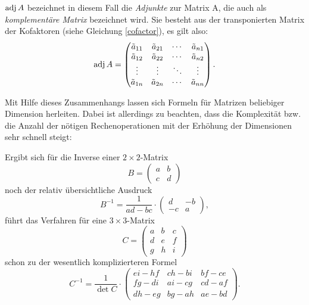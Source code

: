 $\operatorname{adj}A$ bezeichnet in diesem Fall die \emph{Adjunkte} zur Matrix A, die auch als \emph{komplementäre Matrix} bezeichnet wird. Sie besteht aus der transponierten Matrix der Kofaktoren (siehe Gleichung \ref{cofactor}), es gilt also:
\begin{equation}
 \operatorname{adj}A = \begin{pmatrix}
   \tilde a_{11} & \tilde a_{21} & \cdots & \tilde a_{n1}\\
   \tilde a_{12} & \tilde a_{22} & \cdots & \tilde a_{n2}\\
   \vdots & \vdots & \ddots & \vdots\\
   \tilde a_{1n} & \tilde a_{2n} & \cdots & \tilde a_{nn}
 \end{pmatrix}.
\end{equation}

Mit Hilfe dieses Zusammenhangs lassen sich Formeln für Matrizen beliebiger Dimension herleiten. Dabei ist allerdings zu beachten, dass die Komplexität bzw. die Anzahl der nötigen Rechenoperationen mit der Erhöhung der Dimensionen sehr schnell steigt:

Ergibt sich für die Inverse einer $2 \times 2$-Matrix
\begin{equation}
 B = \begin{pmatrix}
  a & b \\
  c & d
 \end{pmatrix}
\end{equation}
noch der relativ übersichtliche Ausdruck
\begin{equation}
 B^{-1} = \frac{1}{ad-bc} \cdot
 \begin{pmatrix}
  d & -b \\
  -c & a
 \end{pmatrix},
\end{equation}
führt das Verfahren für eine $3 \times 3$-Matrix
\begin{equation}
 C = \begin{pmatrix}
  a & b & c \\
  d & e & f \\
  g & h & i
 \end{pmatrix}
\end{equation}
schon zu der wesentlich komplizierteren Formel
\begin{equation}
 C^{-1} = \frac{1}{\det C} \cdot
 \begin{pmatrix}
  ei - hf & ch - bi & bf - ce \\
  fg - di & ai - cg & cd - af \\
  dh - eg & bg - ah & ae - bd
 \end{pmatrix}.
\end{equation}


